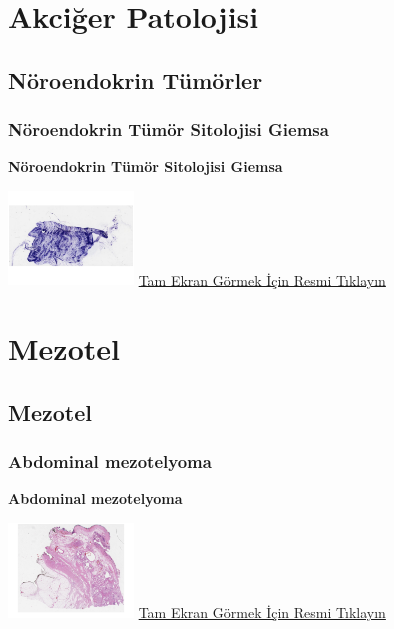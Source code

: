 \documentclass[
  letterpaper,
  DIV=11,
  numbers=noendperiod]{scrreprt}
\begin{document}
\part{Akciğer Patolojisi}

\hypertarget{sec-noroendokrin-tumorler}{%
\chapter{Nöroendokrin Tümörler}\label{sec-noroendokrin-tumorler}}

\hypertarget{sec-noroendokrin-tumor-sitolojisi-giemsa}{%
\section{Nöroendokrin Tümör Sitolojisi
Giemsa}\label{sec-noroendokrin-tumor-sitolojisi-giemsa}}

\textbf{Nöroendokrin Tümör Sitolojisi Giemsa}

\href{https://images.patolojiatlasi.com/neuroendocrine-cytology/giemsa.html}{\includegraphics[width=0.25\textwidth,height=\textheight]{./screenshots/thumbnail_neuroendocrine-cytology-giemsa.png}}
\href{https://images.patolojiatlasi.com/neuroendocrine-cytology/giemsa.html}{Tam
Ekran Görmek İçin Resmi Tıklayın}

\part{Mezotel}

\hypertarget{sec-mezotel}{%
\chapter{Mezotel}\label{sec-mezotel}}

\hypertarget{sec-abdominal-mesothelioma}{%
\section{Abdominal mezotelyoma}\label{sec-abdominal-mesothelioma}}

\textbf{Abdominal mezotelyoma}

\href{https://images.patolojiatlasi.com/abdominal-mesothelioma/HE.html}{\includegraphics[width=0.25\textwidth,height=\textheight]{./screenshots/thumbnail_abdominal-mesothelioma.png}}
\href{https://images.patolojiatlasi.com/abdominal-mesothelioma/HE.html}{Tam
Ekran Görmek İçin Resmi Tıklayın}
\end{document}
